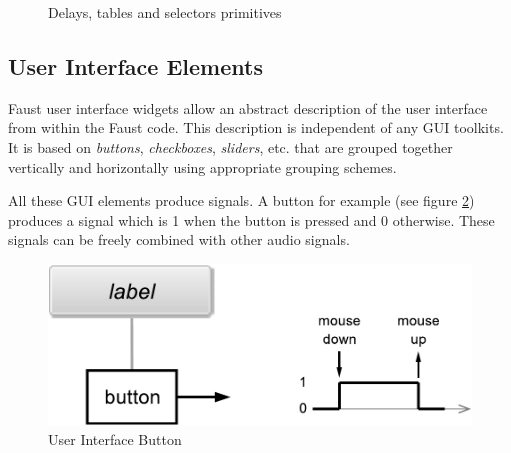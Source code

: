 \documentclass[a4paper]{book}
\begin{document}
\begin{figure}
\caption{Delays, tables and selectors primitives }
\label{fig:delays}
\end{figure}


\subsection{User Interface Elements}


Faust user interface widgets allow an abstract description of the user interface from within the Faust code. This description is
independent of any GUI toolkits. It is based on \emph{buttons}, \emph{checkboxes}, \emph{sliders}, etc. that are grouped together vertically and
horizontally using appropriate grouping schemes.

All these GUI elements produce signals. A button for example (see figure \ref{fig:button}) produces a signal which is 1 when the button is pressed and 0 otherwise.
These signals can be freely combined with other audio signals.

\begin{figure}[h]
\centering
\includegraphics[scale=0.5]{illustrations/button}
\caption{User Interface Button}
\label{fig:button}
\end{figure}


\vspace{5 mm}
\end{document}
